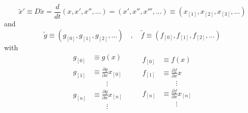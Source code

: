 \documentclass[a4paper, 10pt]{article}
\begin{document}
\begin{equation}
\tilde{x}' \equiv D \tilde{x} = \frac{d}{dt}(x,x',x'',\dots)=(x',x'',x''',\dots)\equiv(x_{[1]}, x_{[2]}, x_{[3]}, \dots)
\end{equation}
and
\begin{equation}
\tilde{g} \equiv (g_{[0]}, g_{[1]}, g_{[2]}, \dots) \quad , \quad \tilde{f} \equiv (f_{[0]}, f_{[1]}, f_{[2]}, \dots)
\end{equation}
with
\begin{equation}
\begin{split}
g_{[0]} & \equiv g(x) \\
g_{[1]} & \equiv \frac{\partial g}{\partial x} x_{[0]} \\
& \qquad \vdots \\
g_{[n]} & \equiv \frac{\partial g}{\partial x} x_{[n]} \\
& \qquad \vdots
\end{split}
\qquad
\begin{split}
f_{[0]} & \equiv f(x) \\
f_{[1]} & \equiv \frac{\partial f}{\partial x} x \\
& \qquad \vdots \\
f_{[n]} & \equiv \frac{\partial f}{\partial x} x_{[n]} \\
& \qquad \vdots
\end{split}
\end{equation}
\end{document}
